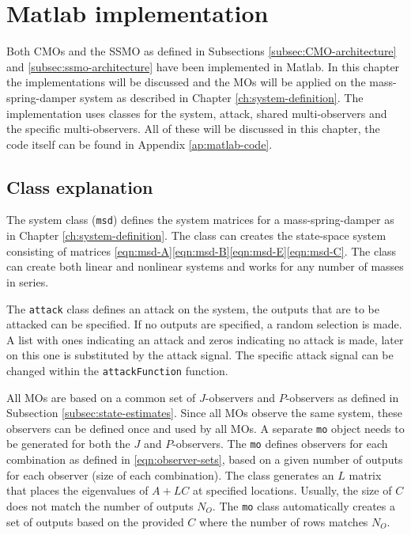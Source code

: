 \section{Matlab implementation}\label{ch:matlab-implementation}
Both CMOs and the SSMO as defined in Subsections \ref{subsec:CMO-architecture} and \ref{subsec:ssmo-architecture} have been implemented in Matlab. In this chapter the implementations will be discussed and the MOs will be applied on the mass-spring-damper system as described in Chapter \ref{ch:system-definition}. The implementation uses classes for the system, attack, shared multi-observers and the specific multi-observers. All of these will be discussed in this chapter, the code itself can be found in Appendix \ref{ap:matlab-code}.

\subsection{Class explanation}
The system class (\texttt{msd}) defines the system matrices for a mass-spring-damper as in Chapter \ref{ch:system-definition}. The class can creates the state-space system consisting of matrices \eqref{eqn:msd-A}\eqref{eqn:msd-B}\eqref{eqn:msd-E}\eqref{eqn:msd-C}. The class can create both linear and nonlinear systems and works for any number of masses in series.

The \texttt{attack} class defines an attack on the system, the outputs that are to be attacked can be specified. If no outputs are specified, a random selection is made. A list with ones indicating an attack and zeros indicating no attack is made, later on this one is substituted by the attack signal. The specific attack signal can be changed within the \texttt{attackFunction} function.

All MOs are based on a common set of $J$-observers and $P$-observers as defined in Subsection \ref{subsec:state-estimates}. Since all MOs observe the same system, these observers can be defined once and used by all MOs. A separate \texttt{mo} object needs to be generated for both the $J$ and $P$-observers. The \texttt{mo} defines observers for each combination as defined in \eqref{eqn:observer-sets}, based on a given number of outputs for each observer (size of each combination). The class generates an $L$ matrix that places the eigenvalues of $A + LC$ at specified locations. Usually, the size of $C$ does not match the number of outputs $N_O$. The \texttt{mo} class automatically creates a set of outputs based on the provided $C$ where the number of rows matches $N_O$.

